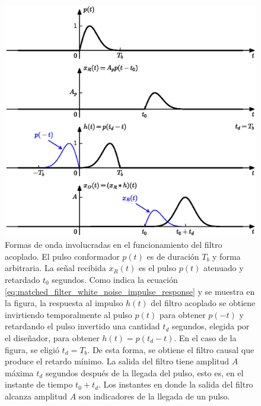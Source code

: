 \documentclass[a4paper]{article}
\begin{document}
\begin{figure}[!htb]
\begin{center}
\includegraphics[width=0.9\columnwidth]{figuras/matched_filter_waveforms.eps}
\caption{\label{fig:matched_filter_waveforms} Formas de onda involucradas en el funcionamiento del filtro acoplado. El pulso conformador \(p(t)\) es de duración \(T_b\) y forma arbitraria. La señal recibida \(x_R(t)\) es el pulso \(p(t)\) atenuado y retardado \(t_0\) segundos. Como indica la ecuación \ref{eq:matched_filter_white_noise_impulse_response} y se muestra en la figura, la respuesta al impulso \(h(t)\) del filtro acoplado se obtiene invirtiendo temporalmente al pulso \(p(t)\) para obtener \(p(-t)\) y retardando el pulso invertido una cantidad \(t_d\) segundos, elegida por el diseñador, para obtener \(h(t)=p(t_d-t)\). En el caso de la figura, se eligió \(t_d=T_b\). De esta forma, se obtiene el filtro causal que produce el retardo mínimo. La salida del filtro tiene amplitud \(A\) máxima \(t_d\) segundos después de la llegada del pulso, esto es, en el instante de tiempo \(t_0+t_d\). Los instantes en donde la salida del filtro alcanza amplitud \(A\) son indicadores de la llegada de un pulso.}
\end{center}
\end{figure}
\end{document}
